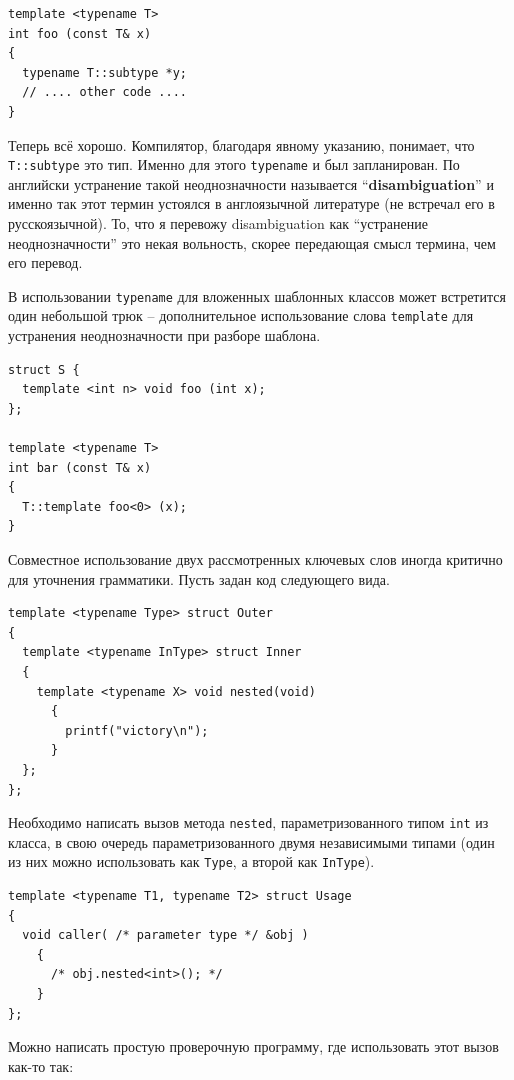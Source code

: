 \documentclass[a4paper,12pt,oneside]{article}
\begin{document}
\begin{lstlisting}
template <typename T>
int foo (const T& x)
{
  typename T::subtype *y;
  // .... other code ....
}
\end{lstlisting}

Теперь всё хорошо. Компилятор, благодаря явному указанию, понимает, что \lstinline!T::subtype! это тип. Именно для этого \lstinline!typename! и был запланирован. По английски устранение такой неоднозначности называется ``\textbf{disambiguation}''  и именно так этот термин устоялся в англоязычной литературе (не встречал его в русскоязычной). То, что я перевожу disambiguation как ``устранение неоднозначности'' это некая вольность, скорее передающая смысл термина, чем его перевод.

В использовании \lstinline!typename! для вложенных шаблонных классов может встретится один небольшой трюк -- дополнительное использование слова \lstinline!template! для устранения неоднозначности при разборе шаблона. 

\begin{lstlisting}
struct S { 
  template <int n> void foo (int x);
};

template <typename T>
int bar (const T& x)
{
  T::template foo<0> (x);
}
\end{lstlisting}

Совместное использование двух рассмотренных ключевых слов иногда критично для уточнения грамматики. Пусть задан код следующего вида.

\begin{lstlisting}
template <typename Type> struct Outer
{
  template <typename InType> struct Inner
  {
    template <typename X> void nested(void)
      {
        printf("victory\n");
      }
  };
}; 
\end{lstlisting}

Необходимо написать вызов метода \lstinline!nested!, параметризованного типом \lstinline!int! из класса, в свою очередь параметризованного двумя независимыми типами (один из них можно использовать как \lstinline!Type!, а второй как \lstinline!InType!).

\begin{lstlisting}
template <typename T1, typename T2> struct Usage
{
  void caller( /* parameter type */ &obj )
    {
      /* obj.nested<int>(); */
    }
};
\end{lstlisting}

Можно написать простую проверочную программу, где использовать этот вызов как-то так:
\end{document}
